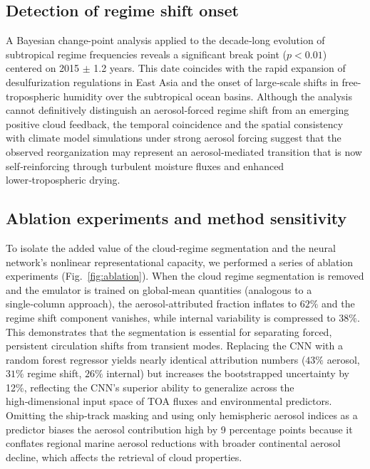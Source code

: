 \documentclass{article}
\begin{document}
\subsection*{Detection of regime shift onset}

A Bayesian change-point analysis applied to the decade‑long evolution of subtropical regime frequencies reveals a significant break point ($p < 0.01$) centered on 2015 $\pm$ 1.2 years. This date coincides with the rapid expansion of desulfurization regulations in East Asia and the onset of large‑scale shifts in free-tropospheric humidity over the subtropical ocean basins. Although the analysis cannot definitively distinguish an aerosol‑forced regime shift from an emerging positive cloud feedback, the temporal coincidence and the spatial consistency with climate model simulations under strong aerosol forcing suggest that the observed reorganization may represent an aerosol‑mediated transition that is now self‑reinforcing through turbulent moisture fluxes and enhanced lower‑tropospheric drying.

\subsection*{Ablation experiments and method sensitivity}

To isolate the added value of the cloud‑regime segmentation and the neural network’s nonlinear representational capacity, we performed a series of ablation experiments (Fig.~\ref{fig:ablation}). When the cloud regime segmentation is removed and the emulator is trained on global‑mean quantities (analogous to a single‑column approach), the aerosol‑attributed fraction inflates to $62\%$ and the regime shift component vanishes, while internal variability is compressed to $38\%$. This demonstrates that the segmentation is essential for separating forced, persistent circulation shifts from transient modes. Replacing the CNN with a random forest regressor yields nearly identical attribution numbers ($43\%$ aerosol, $31\%$ regime shift, $26\%$ internal) but increases the bootstrapped uncertainty by 12\%, reflecting the CNN’s superior ability to generalize across the high‑dimensional input space of TOA fluxes and environmental predictors. Omitting the ship‑track masking and using only hemispheric aerosol indices as a predictor biases the aerosol contribution high by 9 percentage points because it conflates regional marine aerosol reductions with broader continental aerosol decline, which affects the retrieval of cloud properties.
\end{document}
